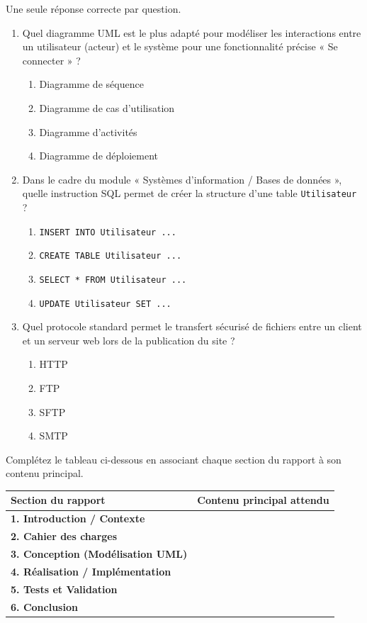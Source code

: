 \documentclass[11pt]{article}
\begin{document}
\begin{exercice}
Une seule réponse correcte par question.
\begin{enumerate}
    \item Quel diagramme UML est le plus adapté pour modéliser les interactions entre un utilisateur (acteur) et le système pour une fonctionnalité précise « Se connecter » ?
    \begin{enumerate}
        \item Diagramme de séquence
        \item Diagramme de cas d'utilisation
        \item Diagramme d'activités
        \item Diagramme de déploiement
    \end{enumerate}
    \item Dans le cadre du module « Systèmes d'information / Bases de données », quelle instruction SQL permet de créer la structure d'une table \texttt{Utilisateur} ?
    \begin{enumerate}
        \item \texttt{INSERT INTO Utilisateur ...}
        \item \texttt{CREATE TABLE Utilisateur ...}
        \item \texttt{SELECT * FROM Utilisateur ...}
        \item \texttt{UPDATE Utilisateur SET ...}
    \end{enumerate}
    \item Quel protocole standard permet le transfert sécurisé de fichiers entre un client et un serveur web lors de la publication du site ?
    \begin{enumerate}
        \item HTTP
        \item FTP
        \item SFTP
        \item SMTP
    \end{enumerate}
\end{enumerate}
\end{exercice}

\begin{exercice}
Complétez le tableau ci-dessous en associant chaque section du rapport à son contenu principal.

\begin{tabularx}{\linewidth}{|>{\bfseries}l|X|}
\hline
\textbf{Section du rapport} & \textbf{Contenu principal attendu} \\
\hline
1. Introduction / Contexte & \dotfill \\
\hline
2. Cahier des charges & \dotfill \\
\hline
3. Conception (Modélisation UML) & \dotfill \\
\hline
4. Réalisation / Implémentation & \dotfill \\
\hline
5. Tests et Validation & \dotfill \\
\hline
6. Conclusion & \dotfill \\
\hline
\end{tabularx}
\end{exercice}
\end{document}
